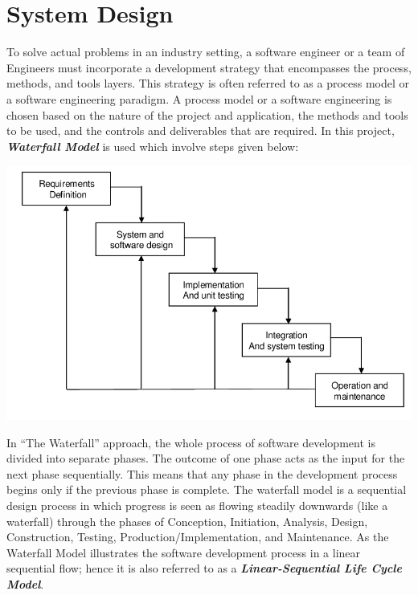 \section{System Design}
		\vs
		To solve actual problems in an industry setting, a software engineer or a team of Engineers must incorporate a development strategy that encompasses the process, methods, and tools layers. This strategy is often referred to as a process model or a software engineering paradigm. A process model or a software engineering is chosen based on the nature of the project and application, the methods and tools to be used, and the controls and deliverables that are required.
		\vs
		In this project, \textbf{\em Waterfall Model} is used which involve steps given below:
		\vs
		\begin{center}
			\includegraphics[width=15cm]{wf.png}
		\end{center}
		In “The Waterfall” approach, the whole process of software development is divided into separate phases. The outcome of one phase acts as the input for the next phase sequentially. This means that any phase in the development process begins only if the previous phase is complete. The waterfall model is a sequential design process in which progress is seen as flowing steadily downwards (like a waterfall) through the phases of Conception, Initiation, Analysis, Design, Construction, Testing, Production/Implementation, and Maintenance.
		\vs
		As the Waterfall Model illustrates the software development process in a linear sequential flow; hence it is also referred to as a \textbf{\em Linear-Sequential Life Cycle Model}.
